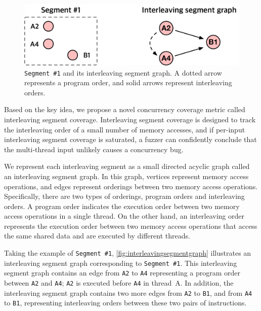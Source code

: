 \newcommand{\mutable}{mutable edge\xspace}
\newcommand{\mutables}{mutable edges\xspace}
\newcommand{\immutable}{immutable edge\xspace}
\newcommand{\immutables}{immutable edges\xspace}

\begin{figure}[t]
  \centering
  \includegraphics[width=0.9\linewidth]{fig/interleavingsegmentgraph.pdf}
  \caption{\texttt{Segment \#1} and its interleaving segment graph. A
    dotted arrow represents a program order, and solid arrows
    represent interleaving orders.}
  \label{fig:interleavingsegmentgraph}
\end{figure}

Based on the key idea, we propose a novel concurrency coverage metric
called interleaving segment coverage.
%
Interleaving segment coverage is designed to track the interleaving
order of a small number of memory accesses, and if per-input
interleaving segment coverage is saturated, a fuzzer can confidently
conclude that the multi-thread input unlikely causes a concurrency
bug.

%
We represent each interleaving segment as a small directed acyclic
graph called an interleaving segment graph.
%
In this graph, vertices represent memory access operations, and edges
represent orderings between two memory access operations.
%
Specifically, there are two types of orderings, program orders and
interleaving orders.
%
A program order indicates the execution order between two memory
access operations in a single thread.
%
On the other hand, an interleaving order represents the execution
order between two memory access operations that access the same shared
data and are executed by different threads.

Taking the example of \texttt{Segment \#1},
\autoref{fig:interleavingsegmentgraph} illustrates an interleaving
segment graph corresponding to \texttt{Segment \#1}.
%
This interleaving segment graph contains an edge from \texttt{A2} to
\texttt{A4} representing a program order between \texttt{A2} and
\texttt{A4}; \texttt{A2} is executed before \texttt{A4} in thread~A.
%
In addition, the interleaving segment graph contains two more edges
from \texttt{A2} to \texttt{B1}, and from \texttt{A4} to \texttt{B1},
representing interleaving orders between these two pairs of
instructions.


